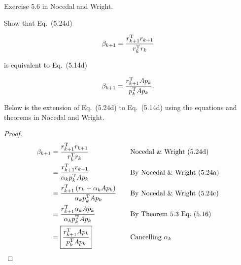 \begin{problem}
  Exercise 5.6 in Nocedal and Wright.

  Show that Eq.~(5.24d) 
  
  \[ \beta_{k+1} = \frac{r_{k+1}^{\textnormal{T}} r_{k+1}}{r_{k}^{\textnormal{T}} r_{k}} \]

  is equivalent to Eq.~(5.14d)

  \[ \beta_{k+1} = \frac{r_{k+1}^{\textnormal{T}} Ap_{k}}{p_{k}^{\textnormal{T}} Ap_{k}} \text{.}\]
\end{problem}


\noindent
Below is the extension of Eq.~(5.24d) to Eq.~(5.14d) using the equations and theorems in Nocedal and Wright.

\begin{proof}
  \begin{alignat*}{2}
    \beta_{k+1} &= \frac{r_{k+1}^{\textnormal{T}} r_{k+1}}{r_{k}^{\textnormal{T}} r_{k}} &\quad &\text{Nocedal \& Wright~(5.24d)} \\
    &= \frac{r_{k+1}^{\textnormal{T}} r_{k+1}}{\alpha_{k}p^{\textnormal{T}}_{k}Ap_{k}} &\quad &\text{By Nocedal \& Wright~(5.24a)} \\
    &= \frac{r_{k+1}^{\textnormal{T}} \left(r_{k} + \alpha_{k}Ap_{k}\right)}{\alpha_{k}p^{\textnormal{T}}_{k}Ap_{k}} &\quad &\text{By Nocedal \& Wright~(5.24c)} \\
    &= \frac{r_{k+1}^{\textnormal{T}} \alpha_{k}Ap_{k}}{\alpha_{k}p^{\textnormal{T}}_{k}Ap_{k}} &\quad &\text{By Theorem~5.3 Eq.~(5.16)} \\
    &=\boxed{\frac{r^{\textnormal{T}}_{k+1}Ap_{k}}{p^{\textnormal{T}}_{k}Ap_{k}}} &\quad &\text{Cancelling } \alpha_{k}
  \end{alignat*}
\end{proof}
